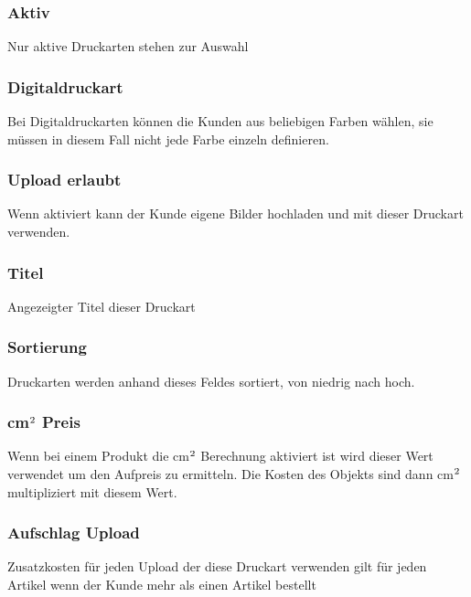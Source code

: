 \documentclass[letterpaper,10pt,ngerman]{sphinxmanual}
\begin{document}
\subsubsection{Aktiv}
\label{\detokenize{hbe/printtypes:aktiv}}
Nur aktive Druckarten stehen zur Auswahl


\subsubsection{Digitaldruckart}
\label{\detokenize{hbe/printtypes:digitaldruckart}}
Bei Digitaldruckarten können die Kunden aus beliebigen Farben wählen,
sie müssen in diesem Fall nicht jede Farbe einzeln definieren.


\subsubsection{Upload erlaubt}
\label{\detokenize{hbe/printtypes:upload-erlaubt}}
Wenn aktiviert kann der Kunde eigene Bilder hochladen und mit dieser Druckart
verwenden.


\subsubsection{Titel}
\label{\detokenize{hbe/printtypes:titel}}
Angezeigter Titel dieser Druckart


\subsubsection{Sortierung}
\label{\detokenize{hbe/printtypes:sortierung}}
Druckarten werden anhand dieses Feldes sortiert, von niedrig nach hoch.


\subsubsection{cm\(\sp{\text{2}}\) Preis}
\label{\detokenize{hbe/printtypes:cm2-preis}}
Wenn bei einem Produkt die cm\(\sp{\text{2}}\) Berechnung aktiviert ist wird dieser Wert
verwendet um den Aufpreis zu ermitteln. Die Kosten des Objekts sind dann
cm\(\sp{\text{2}}\) multipliziert mit diesem Wert.


\subsubsection{Aufschlag Upload}
\label{\detokenize{hbe/printtypes:aufschlag-upload}}
Zusatzkosten für jeden Upload der diese Druckart verwenden \sphinxhyphen{}
gilt für jeden Artikel wenn der Kunde mehr als einen Artikel bestellt
\end{document}
